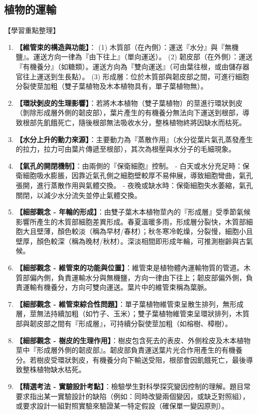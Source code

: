 \documentclass[11pt,a4paper]{article}
\begin{document}
\subsection{植物的運輸}
\begin{learningpoints}{【學習重點整理】}
\begin{enumerate}[label=\arabic*.]
  \item \textbf{【維管束的構造與功能】}：
  (1) 木質部（在內側）：運送『水分』與『無機鹽』。運送方向一律為『由下往上』（單向運送）。
  (2) 韌皮部（在外側）：運送『有機養分』（如糖類）。運送方向為『雙向運送』（可由葉往根，或由儲存器官往上運送到生長點）。
  (3) 形成層：位於木質部與韌皮部之間，可進行細胞分裂使莖加粗（雙子葉植物及木本植物具有，單子葉植物無）。
  \item \textbf{【環狀剝皮的生理影響】}：若將木本植物（雙子葉植物）的莖進行環狀剝皮（剝除形成層外側的韌皮部），葉片產生的有機養分無法向下運送到根部，導致根部先飢餓死亡，隨後根部無法吸收水分，整株植物終將因缺水而枯死。
  \item \textbf{【水分上升的動力來源】}：主要動力為『蒸散作用』（水分從葉片氣孔蒸發產生的拉力，拉力可由葉片傳遞至根部），其次為根壓與水分子的毛細現象。
  \item \textbf{【氣孔的開閉機制】}：由兩側的『保衛細胞』控制。
  - 白天或水分充足時：保衛細胞吸水膨脹，因靠近氣孔側之細胞壁較厚不易伸展，導致細胞彎曲，氣孔張開，進行蒸散作用與氣體交換。
  - 夜晚或缺水時：保衛細胞失水萎縮，氣孔關閉，以減少水分流失並停止氣體交換。
  \item \textbf{【細部觀念 - 年輪的形成】}：由雙子葉木本植物莖內的『形成層』受季節氣候影響所產生的木質部細胞差異形成。春夏溫暖多雨，形成層分裂快，木質部細胞大且壁薄，顏色較淡（稱為早材/春材）；秋冬寒冷乾燥，分裂慢，細胞小且壁厚，顏色較深（稱為晚材/秋材）。深淡相間即形成年輪，可推測樹齡與古氣候。
  \item \textbf{【細部觀念 - 維管束的功能與位置】}：維管束是植物體內運輸物質的管道。木質部偏內側，負責運輸水分與無機鹽，方向一律由下往上；韌皮部偏外側，負責運輸有機養分，方向可雙向運送。葉片中的維管束稱為葉脈。
  \item \textbf{【細部觀念 - 維管束綜合性問題】}：單子葉植物維管束呈散生排列，無形成層，莖無法持續加粗（如竹子、玉米）；雙子葉植物維管束呈環狀排列，木質部與韌皮部之間有『形成層』，可持續分裂使莖加粗（如榕樹、樟樹）。
  \item \textbf{【細部觀念 - 樹皮的生理作用】}：樹皮包含死去的表皮、外側栓皮及木本植物莖中『形成層外側的韌皮部』。韌皮部負責運送葉片光合作用產生的有機養分。若樹皮受環狀剝皮，有機養分向下輸送受阻，根部會因飢餓死亡，最後導致整株植物缺水枯死。
  \item \textbf{【精選考法 - 實驗設計考點】}：檢驗學生對科學探究變因控制的理解。題目常要求指出某一實驗設計的缺陷（例如：同時改變兩個變因，或缺乏對照組），或要求設計一組對照實驗來驗證某一特定假設（確保單一變因原則）。
\end{enumerate}
\end{learningpoints}
\end{document}
